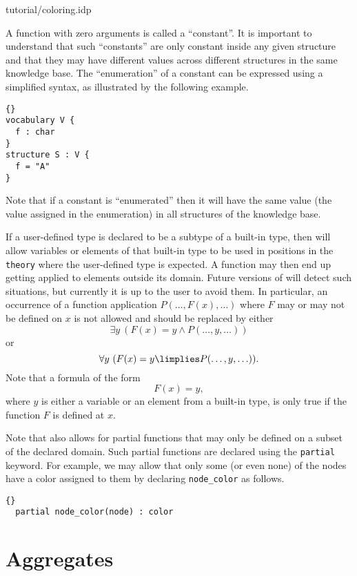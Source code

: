 \documentclass{article}
\begin{document}

	{tutorial/coloring.idp}

A function with zero arguments is called a ``constant''.
It is important to understand that such ``constants'' are only constant
inside any given structure and that they may have different values
across different structures in the same knowledge base.
The ``enumeration'' of a constant can be expressed using a simplified
syntax, as illustrated by the following example.
\begin{lstlisting}{}
vocabulary V {
  f : char
}
structure S : V {
  f = "A"
}
\end{lstlisting}
Note that if a constant is ``enumerated'' then it will have the
same value (the value assigned in the enumeration) in all structures
of the knowledge base.

If a user-defined type is declared to be a subtype of a built-in type,
then \idp will allow variables or elements of that built-in type to
be used in positions in the \texttt{theory} where the user-defined
type is expected.  A function may then end up getting applied
to elements outside its domain.
Future versions of \idp will detect such situations, but currently
it is up to the user to avoid them.
In particular, an occurrence of a function application
$P(\ldots,F(x),\ldots)$ where $F$ may or may not be defined on $x$
is not allowed and should be replaced by either
$$\exists y\ (F(x) = y \land P(\ldots,y,\ldots))$$
or
$$\forall y\ (F(x) = y \limplies P(\ldots,y,\ldots)).$$
Note that a formula of the form
$$
F(x) = y,
$$
where $y$ is either a variable or an element from a built-in type,
is only true if the function $F$ is defined at $x$.

Note that \idp also allows for partial functions that may only be
defined on a subset of the declared domain.  Such partial functions
are declared using the \texttt{partial} keyword.
For example, we may allow that only some (or even none) of the nodes
have a color assigned to them by declaring \lstinline{node_color} as follows.
\begin{lstlisting}{}
  partial node_color(node) : color
\end{lstlisting}

\section{Aggregates}
\end{document}

